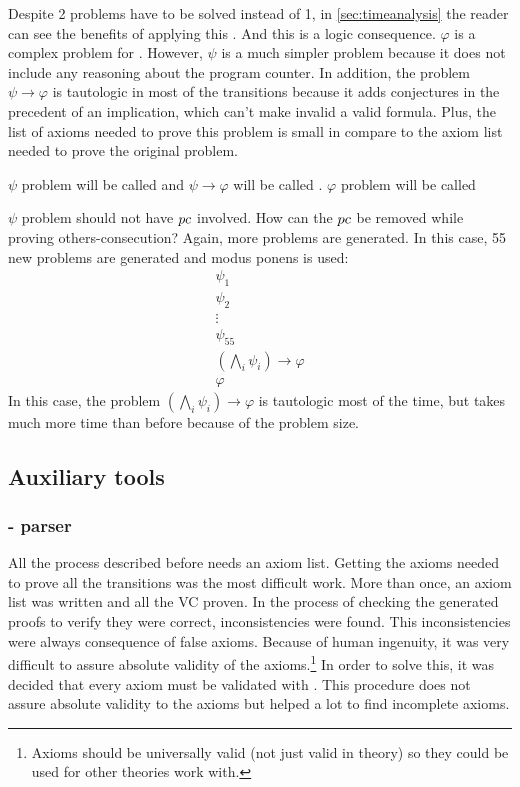 Despite 2 \spass problems have to be solved instead of 1, in \ref{sec:timeanalysis} the reader can see the benefits of applying this .
%
And this is a logic consequence. $\varphi$ is a complex problem for \spass. 
%
However, $\psi$ is a much simpler problem because it does not include any reasoning about the program counter. 
In addition, the problem $\psi \to \varphi$ is tautologic in most of the transitions because it adds conjectures in the precedent of an implication, which can't make invalid a valid formula.
%
Plus, the list of axioms needed to prove this problem is small in compare to the axiom list needed to prove the original problem.


$\psi$ problem will be called \textbf{\reducedProblem} and $\psi \to \varphi$ will be called \textbf{\smallToBig}. $\varphi$ problem will be called \textbf{\originalProblem}

$\psi$ \spass problem should not have $pc$ involved. How can the $pc$ be removed while proving others-consecution?
%
Again, more \spass problems are generated. 
%
In this case, 55 new problems are generated and modus ponens is used:
\[
	\begin{array}{l}
		\psi_1\\
		\psi_2\\
		\vdots\\
		\psi_{55}\\
		(\bigwedge_i \psi_i) \to \varphi\\\hline
		\varphi
	\end{array}
\]
In this case, the \spass problem $(\bigwedge_i \psi_i) \to \varphi$ is tautologic most of the time, but \spass takes much more time than before because of the problem size.




\subsection{Auxiliary tools}
\subsubsection{\ocaml - parser}
All the process described before needs an axiom list. 
%
Getting the axioms needed to prove all the transitions was the most difficult work. 
%
More than once, an axiom list was written and all the \gls{VC} proven. In the process of checking the generated proofs to verify they were correct, inconsistencies were found. 
%
This inconsistencies were always consequence of false axioms. 
%
Because of human ingenuity, it was very difficult to assure absolute validity of the axioms.\footnote{Axioms should be universally valid (not just valid in \TLLpL theory) so they could be used for other theories \leap work with.}
%
In order to solve this, it was decided that every axiom must be validated with \leap. 
%
This procedure does not assure absolute validity to the axioms but helped a lot to find incomplete axioms.


